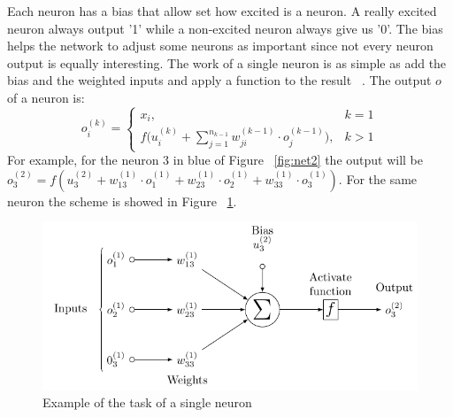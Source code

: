 Each neuron has a bias that allow set how excited is a neuron. A really excited neuron always output '1' while a non-excited neuron always give us '0'. The bias helps the network to adjust some neurons as important since not every neuron output is equally interesting. The work of a single neuron is as simple as add the bias and the weighted inputs and apply a function to the result ~\cite[Chapter~27]{springer}. The output $o$ of a neuron is:
\begin{equation}
  o^{(k)}_i=
  \begin{cases}
    x_i, & k=1 \\
    f\bigg(u^{(k)}_i+\sum^{n_{k-1}}_{j=1}w^{(k-1)}_{ji}\cdot o^{(k-1)}_j\bigg), & k>1
  \end{cases}
\end{equation}
For example, for the neuron 3 in blue of Figure ~\ref{fig:net2} the output will be $o^{(2)}_3=f(u^{(2)}_3+w^{(1)}_{13}\cdot o^{(1)}_1+w^{(1)}_{23}\cdot o^{(1)}_2+w^{(1)}_{33}\cdot o^{(1)}_3)$. For the same neuron the scheme is showed in Figure ~\ref{fig:neur1}.
\begin{figure}[H]
  \center
  \includegraphics[scale=1]{images/neuron1.pdf}
  \caption{\label{fig:neur1}Example of the task of a single neuron \cite{neurdiag}}
\end{figure}
